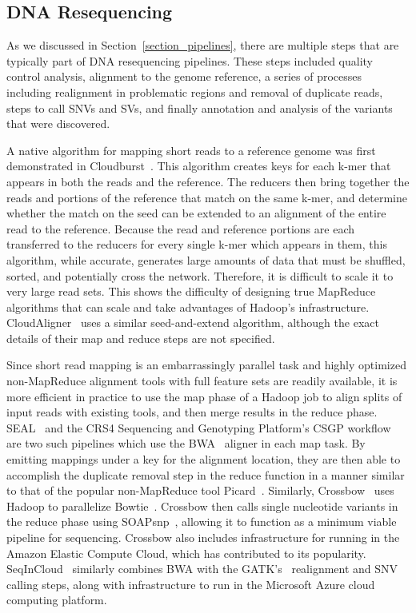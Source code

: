 \subsection{DNA Resequencing}

As we discussed in Section~\ref{section_pipelines}, there are multiple steps that are typically part of DNA resequencing pipelines. These steps included quality control analysis, alignment to the genome reference, a series of processes including realignment in problematic regions and removal of duplicate reads, steps to call SNVs and SVs, and finally annotation and analysis of the variants that were discovered. 

A native algorithm for mapping short reads to a reference genome was first demonstrated in Cloudburst~\cite{Schatz:2009p278}. This algorithm creates keys for each k-mer that appears in both the reads and the reference. The reducers then bring together the reads and portions of the reference that match on the same k-mer, and determine whether the match on the seed can be extended to an alignment of the entire read to the reference. Because the read and reference portions are each transferred to the reducers for every single k-mer which appears in them, this algorithm, while accurate, generates large amounts of data that must be shuffled, sorted, and potentially cross the network. Therefore, it is difficult to scale it to very large read sets. This shows the difficulty of designing true MapReduce algorithms that can scale and take advantages of Hadoop's infrastructure. CloudAligner~\cite{Nguyen:2011p1832} uses a similar seed-and-extend algorithm, although the exact details of their map and reduce steps are not specified.

Since short read mapping is an embarrassingly parallel task and highly optimized non-MapReduce alignment tools with full feature sets are readily available, it is more efficient in practice to use the map phase of a Hadoop job to align splits of input reads with existing tools, and then merge results in the reduce phase. SEAL~\cite{Pireddu:2011fj} and the CRS4 Sequencing and Genotyping Platform's CSGP workflow~\cite{Pireddu:2011:MGS:1996092.1996106} are two such pipelines which use the BWA~\cite{Li:2009p836} aligner in each map task. By emitting mappings under a key for the alignment location, they are then able to accomplish the duplicate removal step in the reduce function in a manner similar to that of the popular non-MapReduce tool Picard~\cite{picard}. Similarly, Crossbow~\cite{Langmead:2009p1225} uses Hadoop to parallelize Bowtie~\cite{Langmead:2009p768}. Crossbow then calls single nucleotide variants in the reduce phase using SOAPsnp~\cite{Li:2009p1236}, allowing it to function as a minimum viable pipeline for sequencing. Crossbow also includes infrastructure for running in the Amazon Elastic Compute Cloud, which has contributed to its popularity. SeqInCloud~\cite{nabeel-bicob13-genome-analysis-cloud} similarly combines BWA with the GATK's~\cite{McKenna:2010p1051} realignment and SNV calling steps, along with infrastructure to run in the Microsoft Azure cloud computing platform.

